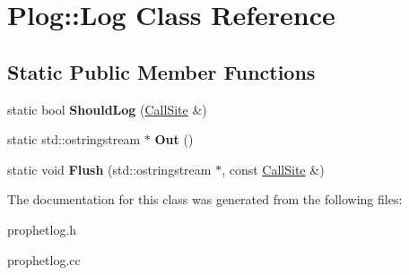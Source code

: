 \hypertarget{classPlog_1_1Log}{
\section{Plog::Log Class Reference}
\label{classPlog_1_1Log}
}
\subsection*{Static Public Member Functions}
\begin{DoxyCompactItemize}
\item 
\hypertarget{classPlog_1_1Log_a4881c1fa2a0fc05d439cbc246cfd4743}{
static bool {\bfseries ShouldLog} (\hyperlink{classPlog_1_1CallSite}{CallSite} \&)}
\label{classPlog_1_1Log_a4881c1fa2a0fc05d439cbc246cfd4743}

\item 
\hypertarget{classPlog_1_1Log_a0d7251048b9f8b3998366e9a283b9547}{
static std::ostringstream $\ast$ {\bfseries Out} ()}
\label{classPlog_1_1Log_a0d7251048b9f8b3998366e9a283b9547}

\item 
\hypertarget{classPlog_1_1Log_abbadf43bf9aae54fb93ed366800deb19}{
static void {\bfseries Flush} (std::ostringstream $\ast$, const \hyperlink{classPlog_1_1CallSite}{CallSite} \&)}
\label{classPlog_1_1Log_abbadf43bf9aae54fb93ed366800deb19}

\end{DoxyCompactItemize}


The documentation for this class was generated from the following files:\begin{DoxyCompactItemize}
\item 
prophetlog.h\item 
prophetlog.cc\end{DoxyCompactItemize}
